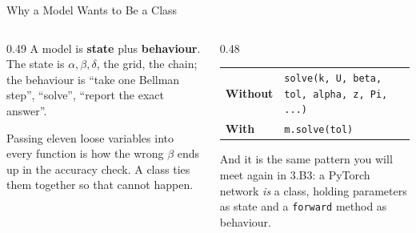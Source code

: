 \begin{frame}{Why a Model Wants to Be a Class}
\begin{columns}[T]
\begin{column}{0.49\textwidth}
\small
A model is \textbf{state} plus \textbf{behaviour}. The state is $\alpha,\beta,\delta$, the grid, the chain; the behaviour is ``take one Bellman step'', ``solve'', ``report the exact answer''.
\medskip

Passing eleven loose variables into every function is how the wrong $\beta$ ends up in the accuracy check. A class ties them together so that cannot happen.
\end{column}
\begin{column}{0.48\textwidth}
\begin{center}\footnotesize
\begin{tabularx}{\linewidth}{@{}>{\raggedright\arraybackslash}p{2.1cm} >{\raggedright\arraybackslash}X@{}}
\toprule
\textbf{Without} & \texttt{solve(k, U, beta, tol, alpha, z, Pi, ...)} \\
\textbf{With} & \texttt{m.solve(tol)} \\
\bottomrule
\end{tabularx}
\end{center}
\medskip
\begin{takeawaybox}\footnotesize
And it is the same pattern you will meet again in 3.B3: a PyTorch network \emph{is} a class, holding parameters as state and a \texttt{forward} method as behaviour.
\end{takeawaybox}
\end{column}
\end{columns}
\vspace{1mm}
\end{frame}

